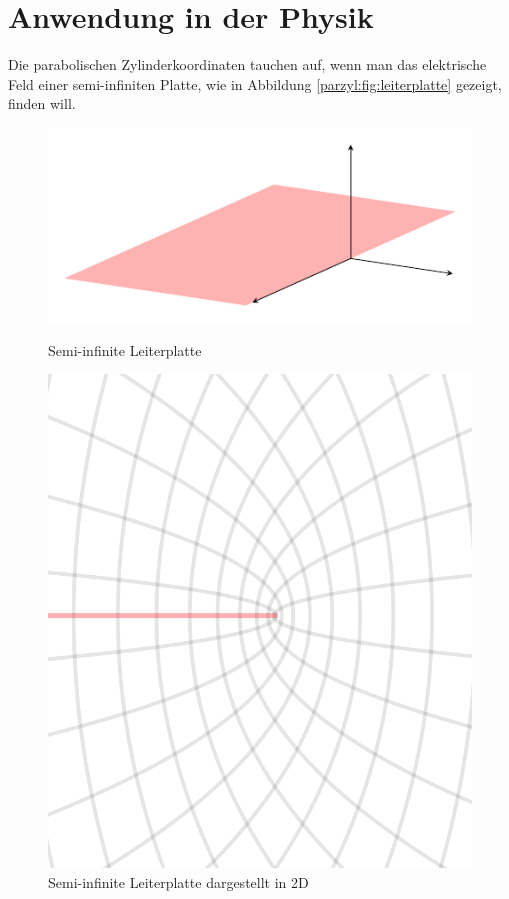 %
%
%
\section{Anwendung in der Physik 
\label{parzyl:section:teil2}}

Die parabolischen Zylinderkoordinaten tauchen auf, wenn man das elektrische Feld einer semi-infiniten Platte, wie in Abbildung \ref{parzyl:fig:leiterplatte} gezeigt, finden will.
\begin{figure}
	\centering
	\begin{minipage}{.7\textwidth}
		 \centering
		\includegraphics[width=\textwidth]{papers/parzyl/img/plane.pdf}
		\caption{Semi-infinite Leiterplatte}
		\label{parzyl:fig:leiterplatte}
	\end{minipage}%
	\begin{minipage}{.25\textwidth}
		\centering
	\includegraphics[width=\textwidth]{papers/parzyl/img/Plane_2D.png}
	\caption{Semi-infinite Leiterplatte dargestellt in 2D}
	\label{parzyl:fig:leiterplatte_2d}
	\end{minipage}
\end{figure}
